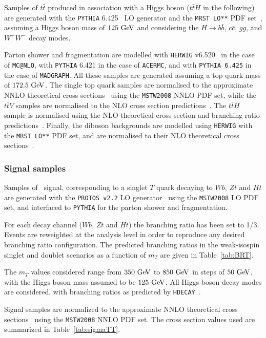 Samples of $t\bar{t}$ produced in association with a Higgs boson
($t\bar{t}H$ in the following) are generated with the 
{\tt PYTHIA} 6.425~\cite{py6} LO generator and the {\tt MRST LO**} PDF set~\cite{mrst},
assuming a Higgs boson mass of $125\gev$ and considering the 
$H\to b\bar{b}$, $c\bar{c}$, $gg$, and $W^+W^-$ decay modes.

Parton shower and fragmentation are modelled with {\tt HERWIG}
v6.520~\cite{HERWIG} in the case of {\tt MC@NLO}, with {\tt PYTHIA}
6.421 in the case of {\tt ACERMC}, and with {\tt PYTHIA 6.425} in the
case of {\tt MADGRAPH}.  All these samples are generated assuming a top
quark mass of $172.5\gev$. The single top quark samples are normalised to
the approximate NNLO theoretical cross sections~\cite{stopxs,stopxs_2}
using the {\tt MSTW2008} NNLO PDF set, while the $t\bar{t}V$ samples
are normalised to the NLO cross section predictions~\cite{ttbarVxs1,ttbarVxs2}.
The $t\bar{t}H$ sample is normalised using the NLO theoretical cross section 
and branching ratio predictions~\cite{lhcxs}.
Finally, the diboson backgrounds are modelled using {\tt HERWIG} with
the {\tt MRST LO**} PDF set, and are normalised to their NLO
theoretical cross sections~\cite{dibosonxs}.

\subsubsection{Signal samples}\label{subsec:MCsignal}


Samples of \TTbar\ signal, corresponding to a singlet $T$ quark 
decaying to $Wb$, $Zt$ and $Ht$ are generated with the {\tt PROTOS v2.2} 
LO generator~\cite{AguilarSaavedra:2009es,protos} 
using the  {\tt MSTW2008} LO PDF set, and interfaced to {\tt PYTHIA} for 
the parton shower and fragmentation. 

For each decay channel ($Wb$, $Zt$ and $Ht$) the branching ratio has been 
set to 1/3. Events are reweighted at the analysis level
in order to reproduce any desired branching ratio configuration. 
The predicted branching ratios in the weak-isospin singlet and doublet scenarios as 
a function of $m_{T}$ are given in Table~\ref{tab:BRT}.

The $m_{T}$ values considered range from $350\gev$ to $850\gev$ in steps of $50\gev$, 
with the Higgs boson mass assumed 
to be $125\gev$. All Higgs boson decay modes are considered, 
with branching ratios as predicted by {\tt HDECAY}~\cite{hdecay}.

Signal samples are normalized to the approximate NNLO theoretical cross sections~\cite{ttbarxs} using the {\tt MSTW2008} NNLO PDF set.
The cross section values used are summarized in Table~\ref{tab:sigmaTT}.



